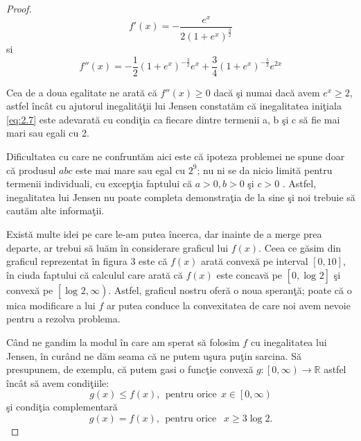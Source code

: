 \documentclass[a4paper,12pt,oneside]{report}
\begin{document}
\begin{proof}
\begin{displaymath}
  {f}'\left ( x \right ) = -\frac{e^{x}}{2 \left ( 1 + e^{x} \right )^{\frac{3}{2}}}
\end{displaymath}
si
\begin{displaymath}
  {f}''\left ( x \right ) = -\frac{1}{2}\left (  1 + e^{x} \right )^{-\frac{3}{2}}e^{x} + \frac{3}{4}\left ( 1 + e^{x} \right )^{-\frac{5}{2}}e^{2x}
\end{displaymath}

Cea de a doua egalitate ne arat\u{a} c\u{a} \({f}''\left ( x \right ) \geq 0\) dac\u{a} \c{s}i numai dac\u{a} avem \(e^{x}\geq 2\), astfel \^{i}nc\^{a}t cu ajutorul inegalit\u{a}\c{t}ii lui Jensen  constat\u{a}m c\u{a} inegalitatea ini\c{t}iala \ref{eq:2.7}  este adevarat\u{a} cu condi\c{t}ia ca fiecare dintre termenii a, b \c{s}i c s\u{a} fie mai mari sau egali cu 2.

Dificultatea cu care ne confrunt\u{a}m aici este c\u{a} ipoteza problemei  ne spune doar  c\u{a} produsul \(abc\) este mai mare sau egal cu \(2^{9}\); nu ni se da nicio  limit\u{a} pentru termenii  individuali, cu excep\c{t}ia faptului c\u{a} \( a > 0, b > 0 \) \c{s}i \(c > 0\) . Astfel, inegalitatea lui Jensen nu poate completa demonstra\c{t}ia de la sine \c{s}i noi trebuie s\u{a} caut\u{a}m alte informa\c{t}ii.

Exist\u{a} multe idei pe care le-am putea \^{i}ncerca, dar inainte de a merge prea departe,  ar trebui s\u{a} lu\u{a}m \^{i}n considerare graficul lui \(f\left ( x \right )\). Ceea ce  g\u{a}sim  din graficul  reprezentat \^{i}n figura 3 este c\u{a} \(f\left ( x \right ) \) arat\u{a} convex\u{a} pe interval \(\left [ 0, 10 \right ]  \), \^{i}n ciuda faptului c\u{a} calculul care arat\u{a} c\u{a} \(f\left ( x \right ) \) este concav\u{a} pe \(\left [ 0, \log _{} 2\right ] \) \c{s}i convex\u{a} pe \(\left [ \log _{} 2 , \infty \right ) \). Astfel, graficul nostru ofer\u{a} o noua speran\c{t}\u{a}; poate c\u{a} o mica modificare a lui \(f\) ar putea conduce la convexitatea de care noi avem nevoie pentru a rezolva problema.

C\^{a}nd ne gandim la modul \^{i}n care am sperat s\u{a} folosim \(f\) cu inegalitatea lui Jensen, \^{i}n cur\^{a}nd ne d\u{a}m seama c\u{a} ne putem u\c{s}ura pu\c{t}in sarcina. S\u{a} presupunem, de exemplu, c\u{a} putem gasi o func\c{t}ie convex\u{a} \(g : \left [ 0 , \infty  \right ) \to \mathbb{R}\) astfel \^{i}nc\^{a}t s\u{a} avem  condi\c{t}iile:
\begin{displaymath}
  g\left ( x \right ) \leq  f\left ( x  \right ),~~ \text{pentru orice}~~ x \in  \left [ 0 , \infty  \right )    \label{eq:2.9} \tag{2.9}
\end{displaymath}
\c{s}i condi\c{t}ia complementar\u{a}
\begin{displaymath}
  g \left ( x \right ) = f \left ( x \right ), ~~ \text{pentru orice }~~  x\geq 3 \log 2. \label{eq:2.10} \tag{2.10}
\end{displaymath}


\end{proof}
\end{document}
